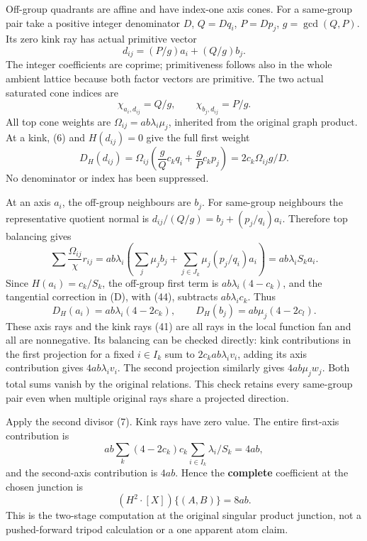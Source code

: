 \documentclass[
  11pt,
]{article}
\begin{document}
Off-group quadrants are affine and have index-one axis cones. For a
same-group pair take a positive integer denominator \(D\), \(Q=Dq_i\),
\(P=Dp_j\), \(g=\gcd(Q,P)\). Its zero kink ray has actual primitive
vector \[
                            d_{ij}=(P/g)a_i+(Q/g)b_j.        \tag{41}
\] The integer coefficients are coprime; primitiveness follows also in
the whole ambient lattice because both factor vectors are primitive. The
two actual saturated cone indices are \[
                    \chi_{a_i,d_{ij}}=Q/g,\qquad
                    \chi_{b_j,d_{ij}}=P/g.                 \tag{42}
\] All top cone weights are \(\Omega_{ij}=ab\lambda_i\mu_j\), inherited
from the original graph product. At a kink, (6) and \(H(d_{ij})=0\) give
the full first weight \[
 D_H(d_{ij})=\Omega_{ij}\left(\frac gQ c_kq_i+\frac gP c_kp_j\right)
                             =2c_k\Omega_{ij}g/D.           \tag{43}
\] No denominator or index has been suppressed.

At an axis \(a_i\), the off-group neighbours are \(b_j\). For same-group
neighbours the representative quotient normal is
\(d_{ij}/(Q/g)=b_j+(p_j/q_i)a_i\). Therefore top balancing gives \[
 \sum\frac{\Omega_{ij}}{\chi}r_{ij}
       =ab\lambda_i\left(\sum_j\mu_jb_j+
                    \sum_{j\in J_k}\mu_j(p_j/q_i)a_i\right)
       =ab\lambda_i S_k a_i.                               \tag{44}
\] Since \(H(a_i)=c_k/S_k\), the off-group first term is
\(ab\lambda_i(4-c_k)\), and the tangential correction in (D), with
(44), subtracts \(ab\lambda_i c_k\). Thus \[
 D_H(a_i)=ab\lambda_i(4-2c_k),\qquad
 D_H(b_j)=ab\mu_j(4-2c_l).                                 \tag{45}
\] These axis rays and the kink rays (41) are all rays in the local
function fan and all are nonnegative. Its balancing can be checked
directly: kink contributions in the first projection for a fixed
\(i\in I_k\) sum to \(2c_kab\lambda_i v_i\), adding its axis
contribution gives \(4ab\lambda_i v_i\). The second projection similarly
gives \(4ab\mu_jw_j\). Both total sums vanish by the original relations.
This check retains every same-group pair even when multiple original
rays share a projected direction.

Apply the second divisor (7). Kink rays have zero value. The entire
first-axis contribution is \[
 ab\sum_k(4-2c_k)c_k\sum_{i\in I_k}\lambda_i/S_k=4ab,
\] and the second-axis contribution is \(4ab\). Hence the
\textbf{complete} coefficient at the chosen junction is \[
                          (H^2\cdot[X])\{(A,B)\}=8ab.              \tag{46}
\] This is the two-stage computation at the original singular product
junction, not a pushed-forward tripod calculation or a one apparent atom
claim.
\end{document}
